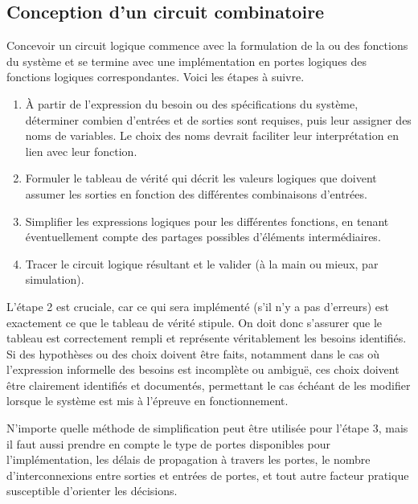 \documentclass[11pt]{article}
\begin{document}
\subsection{Conception d'un circuit combinatoire}
\label{sec:org6677a3f}

Concevoir un circuit logique commence avec la formulation de la ou des
fonctions du système et se termine avec une implémentation en portes
logiques des fonctions logiques correspondantes. Voici les étapes à
suivre.

\begin{enumerate}
\item À partir de l'expression du besoin ou des spécifications du
système, déterminer combien d'entrées et de sorties sont
requises, puis leur assigner des noms de variables. Le choix des noms
devrait faciliter leur interprétation en lien avec leur fonction.

\item Formuler le tableau de vérité qui décrit les valeurs logiques que
doivent assumer les sorties en fonction des différentes
combinaisons d'entrées.

\item Simplifier les expressions logiques pour les différentes fonctions,
en tenant éventuellement compte des partages possibles d'éléments
intermédiaires.

\item Tracer le circuit logique résultant et le valider (à la main ou
mieux, par simulation).
\end{enumerate}

L'étape 2 est cruciale, car ce qui sera implémenté (s'il n'y a pas
d'erreurs) est exactement ce que le tableau de vérité stipule. On
doit donc s'assurer que le tableau est correctement rempli et
représente véritablement les besoins identifiés. Si des hypothèses ou
des choix doivent être faits, notamment dans le cas où l'expression
informelle des besoins est incomplète ou ambiguë, ces choix doivent
être clairement identifiés et documentés, permettant le cas échéant de
les modifier lorsque le système est mis à l'épreuve en fonctionnement.

N'importe quelle méthode de simplification peut être utilisée pour
l'étape 3, mais il faut aussi prendre en compte le type de portes
disponibles pour l'implémentation, les délais de propagation à
travers les portes, le nombre d'interconnexions entre sorties et
entrées de portes, et tout autre facteur pratique susceptible
d'orienter les décisions.
\end{document}
